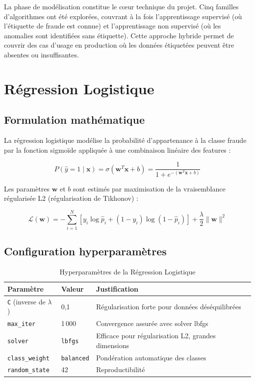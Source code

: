 \documentclass[12pt,a4paper,twoside]{report}
\theoremstyle{definition}
\begin{document}
La phase de modélisation constitue le cœur technique du projet. Cinq familles
d'algorithmes ont été explorées, couvrant à la fois l'apprentissage supervisé
(où l'étiquette de fraude est connue) et l'apprentissage non supervisé (où les
anomalies sont identifiées sans étiquette). Cette approche hybride permet de
couvrir des cas d'usage en production où les données étiquetées peuvent être
absentes ou insuffisantes.

\section{Régression Logistique}

\subsection{Formulation mathématique}

La régression logistique modélise la probabilité d'appartenance à la classe
fraude par la fonction sigmoïde appliquée à une combinaison linéaire des features :

\begin{equation}
P(\hat{y}=1 \mid \mathbf{x}) = \sigma(\mathbf{w}^T \mathbf{x} + b)
= \frac{1}{1 + e^{-(\mathbf{w}^T \mathbf{x} + b)}}
\label{eq:logistic}
\end{equation}

Les paramètres $\mathbf{w}$ et $b$ sont estimés par maximisation de la
vraisemblance régularisée L2 (régularisation de Tikhonov) :

\begin{equation}
\mathcal{L}(\mathbf{w}) = -\sum_{i=1}^{N} \left[
  y_i \log \hat{p}_i + (1 - y_i) \log(1 - \hat{p}_i)
\right] + \frac{\lambda}{2} \|\mathbf{w}\|^2
\label{eq:lr_loss}
\end{equation}

\subsection{Configuration hyperparamètres}

\begin{table}[H]
\centering
\caption{Hyperparamètres de la Régression Logistique}
\label{tab:lr_params}
\renewcommand{\arraystretch}{1.3}
\begin{tabular}{lll}
\toprule
\textbf{Paramètre} & \textbf{Valeur} & \textbf{Justification} \\
\midrule
\texttt{C} (inverse de $\lambda$) & 0,1 & Régularisation forte pour données déséquilibrées \\
\texttt{max\_iter} & 1\,000 & Convergence assurée avec solver lbfgs \\
\texttt{solver} & \texttt{lbfgs} & Efficace pour régularisation L2, grandes dimensions \\
\texttt{class\_weight} & \texttt{balanced} & Pondération automatique des classes \\
\texttt{random\_state} & 42 & Reproductibilité \\
\bottomrule
\end{tabular}
\end{table}
\end{document}
